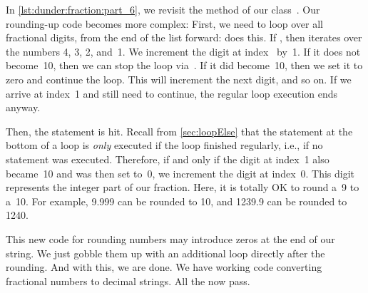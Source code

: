 In \cref{lst:dunder:fraction:part_6}, we revisit the  method of our class~.
Our rounding-up code becomes more complex:
First, we need to loop over all fractional digits, from the end of the list  forward:
 does this.
If , then  iterates over the numbers 4, 3, 2, and~1.
We increment the digit at index~ by~1.
If it does not become~10, then we can stop the loop via~.
If it did become~10, then we set it to zero and continue the loop.
This will increment the next digit, and so on.
If we arrive at index~1 and still need to continue, the regular loop execution ends anyway.

Then, the  statement is hit.
Recall from \cref{sec:loopElse} that the  statement at the bottom of a loop is \emph{only} executed if the loop finished regularly, i.e., if no  statement was executed.
Therefore, if and only if the digit at index~1 also became~10 and was then set to~0, we increment the digit at index~0.
This digit represents the integer part of our fraction.
Here, it is totally OK to round a~9 to a~10.
For example, 9.999 can be rounded to 10, and 1239.9 can be rounded to 1240.

This new code for rounding numbers may introduce zeros at the end of our string.
We just gobble them up with an additional  loop directly after the rounding.
And with this, we are done.
We have working code converting fractional numbers to decimal strings.
All the  now pass.

%
%

